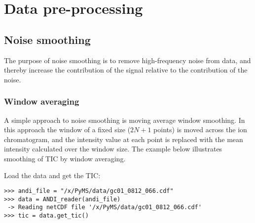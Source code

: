 

\chapter{Data pre-processing}

\section{Noise smoothing}

The purpose of noise smoothing is to remove high-frequency noise from
data, and thereby increase the contribution of the signal relative to
the contribution of the noise.

\subsection{Window averaging}


A simple approach to noise smoothing is moving average window smoothing.
In this approach the window of a fixed size ($2N+1$ points) is moved
across the ion chromatogram, and the intensity value at each point is
replaced with the mean intensity calculated over the window size.
The example below illustrates smoothing of TIC by window averaging.

Load the data and get the TIC:

\begin{verbatim}
>>> andi_file = "/x/PyMS/data/gc01_0812_066.cdf"
>>> data = ANDI_reader(andi_file)
 -> Reading netCDF file '/x/PyMS/data/gc01_0812_066.cdf'
>>> tic = data.get_tic()
\end{verbatim}


